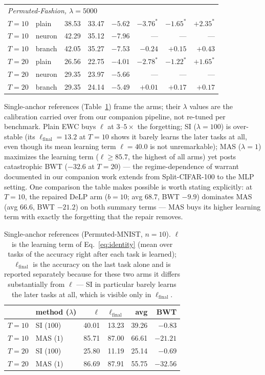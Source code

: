 \documentclass[review,12pt,number]{elsarticle}
\begin{document}
\begin{table}[t]
\begin{tabular}{llrrrr rr}
\midrule
\multicolumn{8}{l}{\emph{Permuted-Fashion, $\lambda{=}5000$}}\\
$T{=}10$ & plain  & 38.53 & 33.47 & $-5.62$ & $-3.76^{*}$ & $-1.65^{*}$ & $+2.35^{*}$ \\
$T{=}10$ & neuron & 42.29 & 35.12 & $-7.96$ & --- & --- & --- \\
$T{=}10$ & branch & 42.05 & 35.27 & $-7.53$ & $-0.24$ & $+0.15$ & $+0.43$ \\
$T{=}20$ & plain  & 26.56 & 22.75 & $-4.01$ & $-2.78^{*}$ & $-1.22^{*}$ & $+1.65^{*}$ \\
$T{=}20$ & neuron & 29.35 & 23.97 & $-5.66$ & --- & --- & --- \\
$T{=}20$ & branch & 29.35 & 24.14 & $-5.49$ & $+0.01$ & $+0.17$ & $+0.17$ \\
\bottomrule
\end{tabular}
\end{table}

Single-anchor references (Table~\ref{tab:refs}) frame the arms; their
$\lambda$ values are the calibration carried over from our companion
pipeline, not re-tuned per benchmark. Plain EWC buys $\ell$ at
$3$--$5\times$ the forgetting; SI ($\lambda{=}100$) is over-stable (its
$\ell_{\mathrm{final}}{=}13.2$ at $T{=}10$ shows it barely learns the later
tasks at all, even though its mean learning term $\ell{=}40.0$ is not
unremarkable); MAS ($\lambda{=}1$) maximizes the learning term
($\ell \ge 85.7$, the highest of all arms) yet posts catastrophic BWT
($-32.6$ at $T{=}20$) --- the regime-dependence of warrant documented
in our companion work extends from Split-CIFAR-100 to the MLP setting. One
comparison the table makes possible is worth stating explicitly: at
$T{=}10$, the repaired \mbox{DeLP} arm ($b{=}10$; avg $68.7$, BWT $-9.9$)
dominates MAS (avg $66.6$, BWT $-21.2$) on both summary terms --- MAS
buys its higher learning term with exactly the forgetting that the repair
removes.

\begin{table}[t]
\centering\small
\caption{Single-anchor references (Permuted-MNIST, $n{=}10$). $\ell$ is the
learning term of Eq.~\eqref{eq:identity} (mean over tasks of the accuracy
right after each task is learned); $\ell_{\mathrm{final}}$ is the accuracy on
the last task alone and is reported separately because for these two arms it
differs substantially from $\ell$ --- SI in particular barely learns the later
tasks at all, which is visible only in $\ell_{\mathrm{final}}$.}
\label{tab:refs}
\begin{tabular}{llrrrr}
\toprule
 & method ($\lambda$) & $\ell$ & $\ell_{\mathrm{final}}$ & avg & BWT \\
\midrule
$T{=}10$ & SI ($100$) & 40.01 & 13.23 & 39.26 & $-0.83$ \\
$T{=}10$ & MAS ($1$)   & 85.71 & 87.00 & 66.61 & $-21.21$ \\
$T{=}20$ & SI ($100$) & 25.80 & 11.19 & 25.14 & $-0.69$ \\
$T{=}20$ & MAS ($1$)   & 86.69 & 87.91 & 55.75 & $-32.56$ \\
\bottomrule
\end{tabular}
\end{table}
\end{document}
